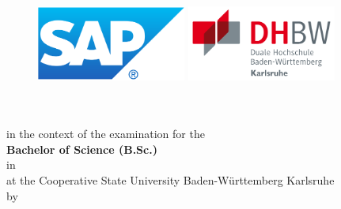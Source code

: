 \thispagestyle{empty}
\begin{titlepage}
\enlargethispage{4cm}

\begin{figure}           %
	\begin{minipage}{0.49\textwidth}
		\flushleft
		\includegraphics[height=2.5cm]{Bilder/Logos/Logo_SAP.pdf} 
	\end{minipage}
	\hfill
	\begin{minipage}{0.49\textwidth}
		\flushright
		\includegraphics[height=2.5cm]{Bilder/Logos/Logo_DHBW.pdf} 
	\end{minipage}
\end{figure} 
\vspace*{0.1cm}

\begin{center}
	\huge{\textbf{\titel}}\\[1.5cm]
	\Large{\textbf{\arbeit}}\\[0.5cm]
	\normalsize{in the context of the examination for the\\[1ex] \textbf{Bachelor of Science (B.Sc.)}}\\[0.5cm]
	\Large{in \studiengang}\\[1ex]
	\normalsize{at the Cooperative State University Baden-Württemberg Karlsruhe}\\[1cm]
	\normalsize{by}\\[1ex] \Large{\textbf{\autor}} \\[1cm]
\end{center}


\end{titlepage}
